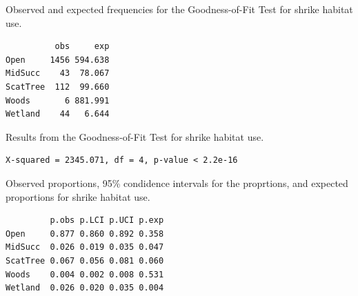 \documentclass[10pt,openany]{book}\usepackage[]{graphicx}\usepackage[]{color}
\makeatletter
\newenvironment{kframe}{%
 \def\at@end@of@kframe{}%
 \ifinner\ifhmode%
  \def\at@end@of@kframe{\end{minipage}}%
  \begin{minipage}{\columnwidth}%
 \fi\fi%
 \def\FrameCommand##1{\hskip\@totalleftmargin \hskip-\fboxsep
 \colorbox{shadecolor}{##1}\hskip-\fboxsep
     \hskip-\linewidth \hskip-\@totalleftmargin \hskip\columnwidth}%
 \MakeFramed {\advance\hsize-\width
   \@totalleftmargin\z@ \linewidth\hsize
   \@setminipage}}%
 {\par\unskip\endMakeFramed%
 \at@end@of@kframe}
\newenvironment{knitrout}{}{} %
\makeatother
\begin{document}
\begin{table}[h]
  \caption{Observed and expected frequencies for the Goodness-of-Fit Test for shrike habitat use.}
  \label{tab:GOFshrikesRes}
  \vspace{-12pt}
\begin{knitrout}
\color{fgcolor}\begin{kframe}
\begin{verbatim}
          obs     exp
Open     1456 594.638
MidSucc    43  78.067
ScatTree  112  99.660
Woods       6 881.991
Wetland    44   6.644
\end{verbatim}
\end{kframe}
\end{knitrout}
\end{table}

\begin{table}[h]
  \caption{Results from the Goodness-of-Fit Test for shrike habitat use.}
  \label{tab:GOFshrikesChi}
  \vspace{-12pt}
\begin{knitrout}
\color{fgcolor}\begin{kframe}
\begin{verbatim}
X-squared = 2345.071, df = 4, p-value < 2.2e-16
\end{verbatim}
\end{kframe}
\end{knitrout}
\end{table}

\begin{table}[h]
  \caption{Observed proportions, 95\% condidence intervals for the proprtions, and expected proportions for shrike habitat use.}
  \label{tab:GOFshrikesCIs}
  \vspace{-12pt}
\begin{knitrout}
\color{fgcolor}\begin{kframe}
\begin{verbatim}
         p.obs p.LCI p.UCI p.exp
Open     0.877 0.860 0.892 0.358
MidSucc  0.026 0.019 0.035 0.047
ScatTree 0.067 0.056 0.081 0.060
Woods    0.004 0.002 0.008 0.531
Wetland  0.026 0.020 0.035 0.004
\end{verbatim}
\end{kframe}
\end{knitrout}
\end{table}


\newpage
\end{document}
